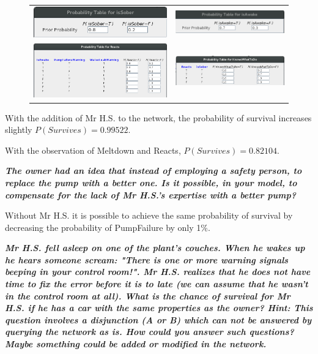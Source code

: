 \begin{figure}[h]
    \centering
    \begin{tabular}{cc}
      \includegraphics[width=.45\linewidth,scale=1]{./images/i.png} & \includegraphics[width=.45\linewidth, scale=1.5]{./images/a.png} \\
      \includegraphics[width=.45\linewidth,scale=1]{./images/r.png} & \includegraphics[width=.45\linewidth, scale=1.5]{./images/k.png} \\
    \end{tabular}
\end{figure}

With the addition of Mr H.S. to the network, the probability of survival
increases slightly $P(Survives)=0.99522$.

With the observation of Meltdown and Reacts, $P(Survives)=0.82104$.

\textit{\textbf{The owner had an idea that instead of employing a safety person,
to replace the pump with a better one. Is it possible, in your model, to
compensate for the lack of Mr H.S.'s expertise with a better pump?}}

\vspace{1em}
Without Mr H.S. it is possible to achieve the same probability of survival by
decreasing the probability of PumpFailure by only 1\%.

\textit{\textbf{Mr H.S. fell asleep on one of the plant's couches.
 When he wakes up he hears someone scream: "There is one or more warning
 signals beeping in your control room!". Mr H.S. realizes that he does not
 have time to fix the error before it is to late (we can assume that he wasn't
  in the control room at all). What is the chance of survival for Mr H.S. if he
   has a car with the same properties as the owner? Hint: This question involves
    a disjunction (A or B) which can not be answered by querying the network
    as is. How could you answer such questions? Maybe something could be added
    or modified in the network.}}

